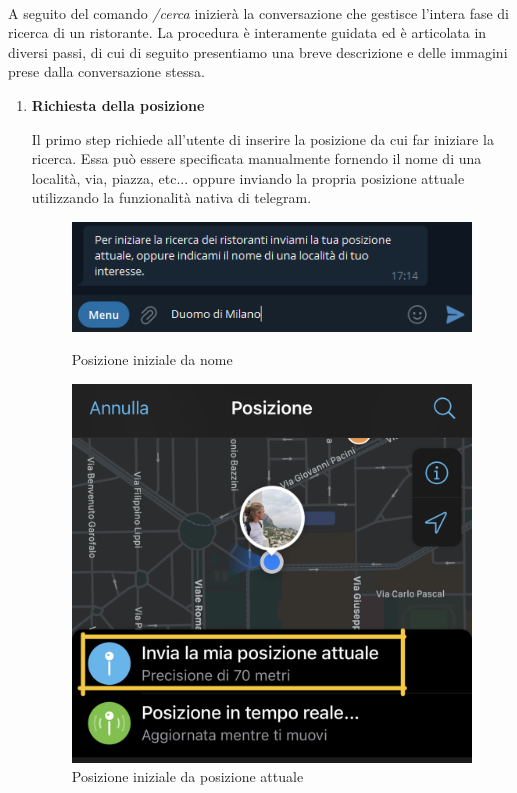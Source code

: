 \documentclass[a4paper, 12pt]{article}
\begin{document}
	\paragraph{}
	A seguito del comando \textit{/cerca} inizierà la conversazione che gestisce l'intera fase di ricerca di un ristorante. La procedura è interamente guidata ed è articolata in diversi passi, di cui di seguito presentiamo una breve descrizione e delle immagini prese dalla conversazione stessa.
	
	\begin{enumerate}
		\item \textbf{Richiesta della posizione}
		
		Il primo step richiede all'utente di inserire la posizione da cui far iniziare la ricerca. Essa può essere specificata manualmente fornendo il nome di una località, via, piazza, etc... oppure inviando la propria posizione attuale utilizzando la funzionalità nativa di telegram.
		
		\begin{figure}[!htb]
			\begin{minipage}{0.45\textwidth}
				\centering
				\includegraphics[width=\linewidth]{cercaCommand_startingPoseByName.png}
				\caption{Posizione iniziale da nome}
			\end{minipage}\hfill
			\begin{minipage}{0.45\textwidth}
				\centering
				\includegraphics[width=\linewidth]{cercaCommand_startingPoseByCurrentPosition.png}
				\caption{Posizione iniziale da posizione attuale}
			\end{minipage}
		\end{figure}
	

\end{enumerate}
\end{document}
